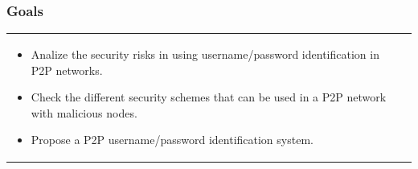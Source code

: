 \begin{frame}
\frametitle{Goals}
\begin{table}
\begin{tabular}{p{7cm}p{3cm}}
\begin{itemize}
  \item Analize the security risks in using username/password identification in P2P networks. 
  \item Check the different security schemes that can be used in a P2P network with malicious nodes.
  \item Propose a P2P username/password identification system.
\end{itemize}
&
\vspace{1.5cm}
\end{tabular}
\end{table}
\end{frame}
